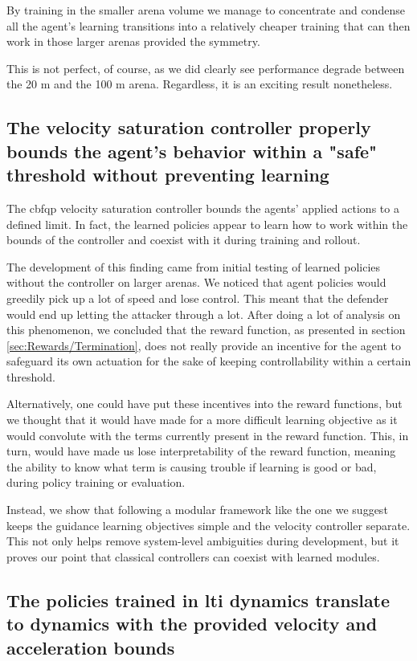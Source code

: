  By training in the smaller arena volume we manage to concentrate and condense all the agent's learning transitions into a relatively cheaper training that can then work in those larger arenas provided the symmetry.

This is not perfect, of course, as we did clearly see performance degrade between the 20 m and the 100 m arena. Regardless, it is an exciting result nonetheless.


\subsection*{The velocity saturation controller properly bounds the agent's behavior within a "safe" threshold without preventing learning}

The \acs{cbfqp} velocity saturation controller bounds the agents' applied actions to a defined limit. In fact, the learned policies appear to learn how to work within the bounds of the controller and coexist with it during training and rollout. 
    
The development of this finding came from initial testing of learned policies without the controller on larger arenas. We noticed that agent policies would greedily pick up a lot of speed and lose control. This meant that the defender would end up letting the attacker through a lot. After doing a lot of analysis on this phenomenon, we concluded that the reward function, as presented in section \ref{sec:Rewards/Termination}, does not really provide an incentive for the agent to safeguard its own actuation for the sake of keeping controllability within a certain threshold.

Alternatively, one could have put these incentives into the reward functions, but we thought that it would have made for a more difficult learning objective as it would convolute with the terms currently present in the reward function. This, in turn, would have made us lose interpretability of the reward function, meaning the ability to know what term is causing trouble if learning is good or bad, during policy training or evaluation.

Instead, we show that following a modular framework like the one we suggest keeps the guidance learning objectives simple and the velocity controller separate. This not only helps remove system-level ambiguities during development, but it proves our point that classical controllers can coexist with learned modules.


\subsection*{The policies trained in \acs{lti} dynamics translate to dynamics with the provided velocity and acceleration bounds}

